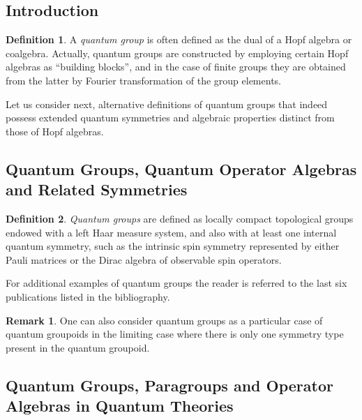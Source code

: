 \documentclass[12pt]{article}
\theoremstyle{plain}
\theoremstyle{definition}
\newtheorem{definition}{Definition}[section]
\newtheorem{remark}{Remark}[section]
\numberwithin{equation}{section}
\newcommand{\<}{{\langle}}
\begin{document}
\subsection{Introduction}
\begin{definition}
A \emph{quantum group} is often defined as the dual of a Hopf algebra or coalgebra. Actually, quantum groups are constructed by employing certain Hopf algebras as ``building blocks'', and in the case of finite groups they are obtained from the latter by Fourier transformation of the group elements.
\end{definition}

Let us consider next, alternative definitions of quantum groups that indeed possess extended quantum symmetries and algebraic properties distinct from those of Hopf algebras.

\subsection{Quantum Groups, Quantum Operator Algebras and Related Symmetries}

\begin{definition}
{\em Quantum groups} are defined as locally compact topological groups endowed with a left Haar measure system, and also with at least one internal quantum symmetry, such as the intrinsic spin symmetry represented by either Pauli matrices or the Dirac algebra of observable spin operators.
\end{definition}

For additional examples of quantum groups the reader is referred to the last six publications listed in the bibliography.


\begin{remark}
One can also consider quantum groups as a particular case of quantum groupoids in the limiting
case where there is only one symmetry type present in the quantum groupoid.
\end{remark}

\subsection{Quantum Groups, Paragroups and Operator Algebras in Quantum Theories}
\end{document}
